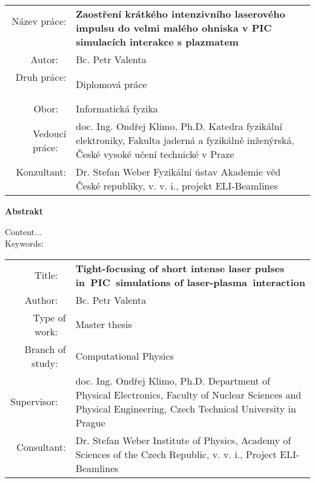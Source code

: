 \documentclass[12pt, twoside, a4paper, openright]{report}
\newcommand{\projecttitle}{Tight-focusing of short intense laser pulses in~PIC~simulations of laser-plasma~interaction }
\newcommand{\projecttitlecz}{Zaostření krátkého intenzivního laserového impulsu do velmi malého ohniska v PIC simulacích interakce s plazmatem }
\newcommand{\valenta}{Bc. Petr Valenta }
\newcommand{\klimo}{doc. Ing. Ondřej Klimo, Ph.D. }
\newcommand{\weber}{Dr. Stefan Weber }
\begin{document}

\newpage
\thispagestyle{empty}
\mbox{}


\newpage
\begin{flushleft}
	\renewcommand{\arraystretch}{1.3}
	\begin{tabular}{r p{12cm}}
		Název práce:
		~ & \bf \projecttitlecz \\
		Autor:
		~ & \valenta \\
		Druh práce:
		~ & Diplomová práce \\
		Obor:
		~ & Informatická fyzika\\
		Vedoucí práce:
		~ & \klimo \newline Katedra fyzikální elektroniky, Fakulta jaderná a fyzikálně inženýrská, České vysoké učení technické v Praze \\
		Konzultant:
		~ & \weber \newline Fyzikální ústav Akademie věd České republiky, v. v. i., projekt ELI-Beamlines \\
	\end{tabular}
\end{flushleft}

\begin{center}
\textbf{Abstrakt}\\
\end{center}

Content...\\

Keywords:



\newpage
\begin{flushleft}
	\renewcommand{\arraystretch}{1.3}
	\begin{tabular}{r p{12cm}}
		Title:
		~ & \bf \projecttitle \\
		Author:
		~ & \valenta \\
		Type of work:
		~ & Master thesis \\
		Branch of study:
		~ & Computational Physics \\
		Supervisor:
		~ & \klimo \newline Department of Physical Electronics, Faculty of Nuclear Sciences and Physical Engineering, Czech Technical University in Prague \\
		Consultant:
		~ & \weber \newline Institute of Physics, Academy of Sciences of the Czech Republic, v. v. i., Project ELI-Beamlines \\
	\end{tabular}
\end{flushleft}
\end{document}
